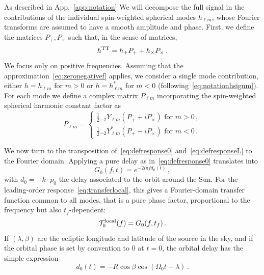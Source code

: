 \documentclass[aps,showpacs,twocolumn,
prd,superscriptaddress,nofootinbib]{revtex4-1}
\newcommand{\be}{\begin{equation}}
\newcommand{\ee}{\end{equation}}
\newcommand\calT{{\mathcal{T}}}
\newcommand{\hatk}{k}
\newcommand{\tf}{t_{f}}
\begin{document}
As described in App.~\ref{app:notation} We will decompose the full signal in the contributions of the individual spin-weighted spherical modes $h_{\ell m}$, whose Fourier transforms are assumed to have a smooth amplitude and phase. First, we define the matrices $P_{+},P_{\times}$ such that, in the sense of matrices,
\be
	h^{\rm TT} = h_{+}P_{+} + h_{\times}P_{\times} \,.
\ee
We focus only on positive frequencies. Assuming that the approximation~\eqref{eq:zeronegativef} applies, we consider a single mode contribution, either $h=h_{\ell m}$ for $m>0$ or $h=h_{\ell m}^{*}$ for $m<0$ (following~\eqref{eq:notationhsignm}). For each mode we define a complex matrix $P_{\ell m}$ incorporating the spin-weighted spherical harmonic constant factor as
\be
	P_{\ell m} = 
	\begin{cases} 
	\frac{1}{2} {}_{-2}Y_{\ell m} \left( P_{+} + i P_{\times} \right) \text{ for } m>0\,,\\
	\frac{1}{2} {}_{-2}Y_{\ell m}^{*} \left( P_{+} - i P_{\times} \right) \text{ for } m<0\,.
	\end{cases}
\ee

We now turn to the transposition of~\eqref{eq:defresponse0} and~\eqref{eq:defresponseL} to the Fourier domain. Applying a pure delay as in~\eqref{eq:defresponse0} translates into
\be\label{eq:G0}
	G_{0}(f, t) = e^{-2i\pi f d_{0}(t)} \,,
\ee
with $d_{0} = -\hatk \cdot p_{0}$ the delay associated to the orbit around the Sun. For the leading-order response~\eqref{eq:transferlocal}, this gives a Fourier-domain transfer function common to all modes, that is a pure phase factor, proportional to the frequency but also $t_{f}$-dependent:
\be\label{eq:transfer0local}
	\calT_{0}^{\rm local}(f) = G_{0}(f, \tf)\,.
\ee
If $(\lambda, \beta)$ are the ecliptic longitude and latitude of the source in the sky, and if the orbital phase is set by convention to $0$ at $t=0$, the orbital delay has the simple expression
\be\label{eq:delay0}
	d_{0}(t) = -R \cos\beta \cos\left(\Omega_{0}t - \lambda\right)\,.
\ee
\end{document}
